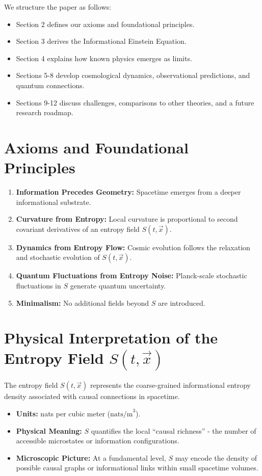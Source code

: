 \documentclass{article}
\begin{document}
We structure the paper as follows:
\begin{itemize}
    \item Section 2 defines our axioms and foundational principles.
    \item Section 3 derives the Informational Einstein Equation.
    \item Section 4 explains how known physics emerges as limits.
    \item Sections 5-8 develop cosmological dynamics, observational predictions, and quantum connections.
    \item Sections 9-12 discuss challenges, comparisons to other theories, and a future research roadmap.
\end{itemize}

\section{Axioms and Foundational Principles}

\begin{enumerate}
    \item \textbf{Information Precedes Geometry:} Spacetime emerges from a deeper informational substrate.
    \item \textbf{Curvature from Entropy:} Local curvature is proportional to second covariant derivatives of an entropy field $S(t, \vec{x})$.
    \item \textbf{Dynamics from Entropy Flow:} Cosmic evolution follows the relaxation and stochastic evolution of $S(t, \vec{x})$.
    \item \textbf{Quantum Fluctuations from Entropy Noise:} Planck-scale stochastic fluctuations in $S$ generate quantum uncertainty.
    \item \textbf{Minimalism:} No additional fields beyond $S$ are introduced.
\end{enumerate}

\section{Physical Interpretation of the Entropy Field $S(t, \vec{x})$}

The entropy field $S(t, \vec{x})$ represents the coarse-grained informational entropy density associated with causal connections in spacetime.

\begin{itemize}
    \item \textbf{Units:} nats per cubic meter ($\text{nats/m}^3$).
    \item \textbf{Physical Meaning:} $S$ quantifies the local ``causal richness'' - the number of accessible microstates or information configurations.
    \item \textbf{Microscopic Picture:} At a fundamental level, $S$ may encode the density of possible causal graphs or informational links within small spacetime volumes.
\end{itemize}
\end{document}
